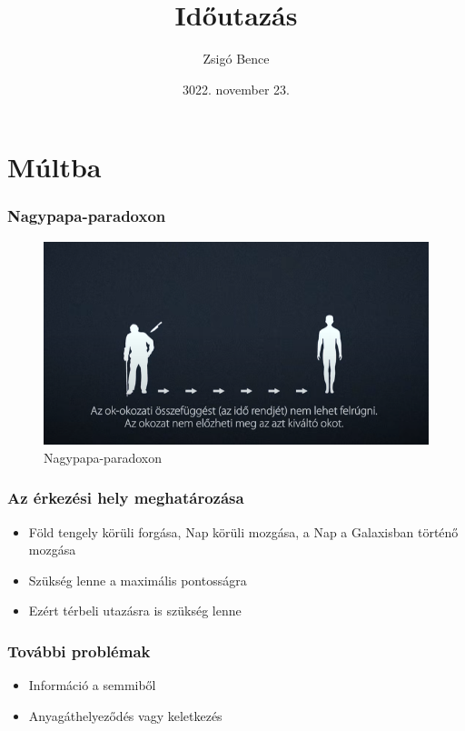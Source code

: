 \documentclass{beamer}
\title{Időutazás}
\author{Zsigó Bence}
\date{3022. november 23.}
\begin{document}
\begin{frame}
\maketitle
\end{frame}

\section*{Múltba}
\begin{frame}
\transdissolve
\sectionpage
\end{frame}

\begin{frame}
\transdissolve
\frametitle{Nagypapa-paradoxon}
\centering
\begin{figure}[bt]
\caption{Nagypapa-paradoxon}
\includegraphics[scale=0.4]{nagypapaparadoxon.png}
\end{figure}
\end{frame}


\begin{frame}
\frametitle{Az érkezési hely meghatározása}
\begin{itemize}
\item Föld tengely körüli forgása, Nap körüli mozgása, a Nap a Galaxisban történő mozgása \pause
\item Szükség lenne a maximális pontosságra \pause
\item Ezért térbeli utazásra is szükség lenne
\end{itemize}
\end{frame}

\begin{frame}
\frametitle{További problémak}
\begin{itemize}
\item Információ a semmiből
\item Anyagáthelyeződés vagy keletkezés
\end{itemize}
\end{frame}
\end{document}
